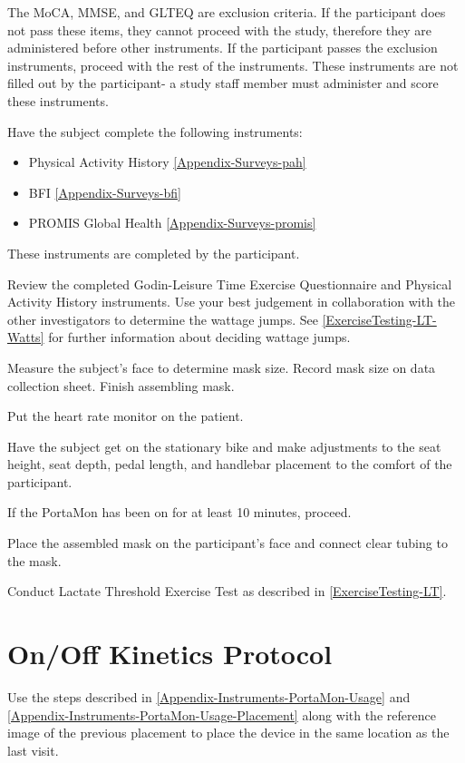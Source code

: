 \documentclass[
]{book}
\providecommand{\tightlist}{%
  \setlength{\itemsep}{0pt}\setlength{\parskip}{0pt}}
\begin{document}
The MoCA, MMSE, and GLTEQ are exclusion criteria. If the participant does not pass these items, they cannot proceed with the study, therefore they are administered before other instruments. If the participant passes the exclusion instruments, proceed with the rest of the instruments. These instruments are not filled out by the participant- a study staff member must administer and score these instruments.

Have the subject complete the following instruments:

\begin{itemize}
\tightlist
\item
  Physical Activity History \ref{Appendix-Surveys-pah}
\item
  BFI \ref{Appendix-Surveys-bfi}
\item
  PROMIS Global Health \ref{Appendix-Surveys-promis}
\end{itemize}

These instruments are completed by the participant.

Review the completed Godin-Leisure Time Exercise Questionnaire and Physical Activity History instruments. Use your best judgement in collaboration with the other investigators to determine the wattage jumps. See \ref{ExerciseTesting-LT-Watts} for further information about deciding wattage jumps.

Measure the subject's face to determine mask size. Record mask size on data collection sheet. Finish assembling mask.

Put the heart rate monitor on the patient.

Have the subject get on the stationary bike and make adjustments to the seat height, seat depth, pedal length, and handlebar placement to the comfort of the participant.

If the PortaMon has been on for at least 10 minutes, proceed.

Place the assembled mask on the participant's face and connect clear tubing to the mask.

Conduct Lactate Threshold Exercise Test as described in \ref{ExerciseTesting-LT}.

\hypertarget{Methods-Onoff}{%
\section{On/Off Kinetics Protocol}\label{Methods-Onoff}}

Use the steps described in \ref{Appendix-Instruments-PortaMon-Usage} and \ref{Appendix-Instruments-PortaMon-Usage-Placement} along with the reference image of the previous placement to place the device in the same location as the last visit.
\end{document}
